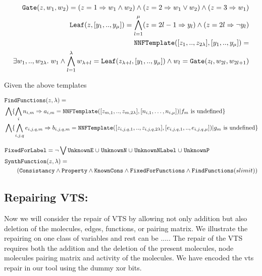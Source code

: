 
\begin{align*}
  \texttt{Gate}( z, w_1, w_2 ) = ( z  = 1 \Rightarrow w_1  \land w_2 ) \land  
  ( z = 2  \Rightarrow w_1  \lor w_2 ) \land
  ( z = 3  \Rightarrow w_1 )\\
  \texttt{Leaf}( z, [y_1,..,y_\mu] ) =
  \bigwedge\limits_{l=1}^{\mu} ( z = 2l-1  \Rightarrow y_{l}) \land ( z = 2l  \Rightarrow \lnot y_{l})\\
  \texttt{NNFTemplate}([z_1,..,z_{2\lambda}],[y_1,..,y_\mu] ) = \\
  \exists w_1,..,w_{2\lambda}.\;w_1 \land \bigwedge_{l=1}^{\lambda} w_{\lambda+l} = \texttt{Leaf}( z_{\lambda+l}, [y_1,..,y_\mu] ) \land
  w_{l} = \texttt{Gate}( z_l, w_{2l},w_{2l+1})
\end{align*}

Given the above templates 

\begin{align*}
  &\texttt{FindFunctions}(z,\lambda) =\\
  &\bigwedge \{ \bigwedge\limits_{i} n_{i,m} \Rightarrow a_{i,m} = 
  \texttt{NNFTemplate}([z_{m,1},..,z_{m,2\lambda}],[n_{i,1},\dots,n_{i,\mu}] ) |
  f_m \text{ is undefined}\} \\
  &\bigwedge \{ \bigwedge\limits_{i,j,q} e_{i,j,q,m} \Rightarrow b_{i,j,q,m} = 
  \texttt{NNFTemplate}([z_{i,j,q,1},..,z_{i,j,q,2\lambda}],[e_{i,j,q,1},..,e_{i,j,q,\mu}] ) | 
  g_m \text{ is undefined}
  \}
\end{align*}

\begin{align*}
    & \texttt{FixedForLabel} = \lnot \bigvee \texttt{UnknownE} \;{\cup}\; \texttt{UnknownN} \;{\cup}\;
                    \texttt{UnknownNLabel} \;{\cup}\;
                    \texttt{UnknownP}\\
  &\texttt{SynthFunction}(z,\lambda) = \\
  & \quad\quad
    (  \texttt{Consistancy}\land \texttt{Property} \land
  \texttt{KnownCons} \land \texttt{FixedForFunctions} \land \texttt{FindFunctions}(slimit) )
\end{align*}

\subsection{Repairing VTS:}
%
Now we will consider the repair of VTS by allowing not only addition but also
deletion of the molecules, edges, functions, or pairing matrix.
%
We illustrate the repairing on one class of variables and rest can be .....
%
The repair of the VTS requires both the addition and the deletion of
the present molecules, node molecules pairing matrix and activity of
the molecules. We have encoded the vts repair in our tool using the
dummy xor bits.



